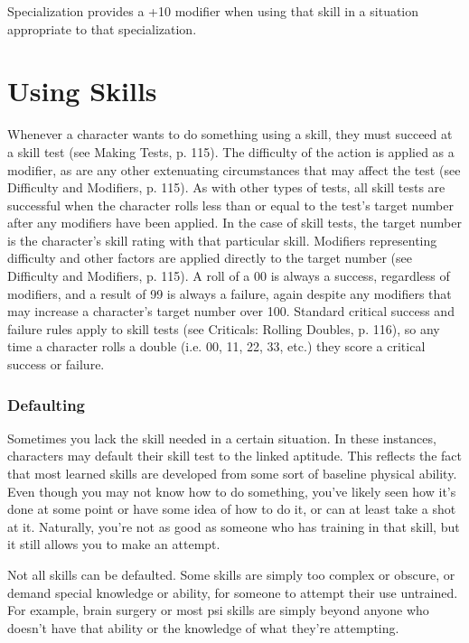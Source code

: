 Specialization provides a +10 modifier when
using that skill in a situation appropriate to that
specialization.




\section{Using Skills}
Whenever a character wants to do something using
a skill, they must succeed at a skill test (see Making
Tests, p. 115). The difficulty of the action is applied
as a modifier, as are any other extenuating circumstances that may affect the test (see Difficulty and
Modifiers, p. 115). As with other types of tests, all skill
tests are successful when the character rolls less than
or equal to the test’s target number after any modifiers have been applied. In the case of skill tests, the
target number is the character’s skill rating with that
particular skill. Modifiers representing difficulty and
other factors are applied directly to the target number
(see Difficulty and Modifiers, p. 115). A roll of a 00 is
always a success, regardless of modifiers, and a result
of 99 is always a failure, again despite any modifiers
that may increase a character’s target number over
100. Standard critical success and failure rules apply
to skill tests (see Criticals: Rolling Doubles, p. 116),
so any time a character rolls a double (i.e. 00, 11, 22,
33, etc.) they score a critical success or failure.


 \subsubsection{Defaulting}
Sometimes you lack the skill needed in a certain situation. In these instances, characters may default their
skill test to the linked aptitude. This reflects the fact
that most learned skills are developed from some sort
of baseline physical ability. Even though you may not
know how to do something, you’ve likely seen how
it’s done at some point or have some idea of how to
do it, or can at least take a shot at it. Naturally, you’re
not as good as someone who has training in that skill,
but it still allows you to make an attempt.

Not all skills can be defaulted. Some skills are
simply too complex or obscure, or demand special
knowledge or ability, for someone to attempt their
use untrained. For example, brain surgery or most psi
skills are simply beyond anyone who doesn’t have that
ability or the knowledge of what they’re attempting.

